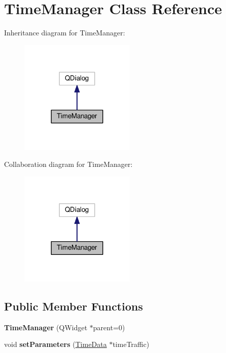 \hypertarget{class_time_manager}{}\section{Time\+Manager Class Reference}
\label{class_time_manager}


Inheritance diagram for Time\+Manager\+:
\nopagebreak
\begin{figure}[H]
\begin{center}
\leavevmode
\includegraphics[width=156pt]{class_time_manager__inherit__graph}
\end{center}
\end{figure}


Collaboration diagram for Time\+Manager\+:
\nopagebreak
\begin{figure}[H]
\begin{center}
\leavevmode
\includegraphics[width=156pt]{class_time_manager__coll__graph}
\end{center}
\end{figure}
\subsection*{Public Member Functions}
\begin{DoxyCompactItemize}
\item 
{\bfseries Time\+Manager} (Q\+Widget $\ast$parent=0)\hypertarget{class_time_manager_a85082f26e4bffcccafba8e115677bbc7}{}\label{class_time_manager_a85082f26e4bffcccafba8e115677bbc7}

\item 
void {\bfseries set\+Parameters} (\hyperlink{class_time_data}{Time\+Data} $\ast$time\+Traffic)\hypertarget{class_time_manager_af90d77276284a55244df071dde93b1cb}{}\label{class_time_manager_af90d77276284a55244df071dde93b1cb}

\end{DoxyCompactItemize}


